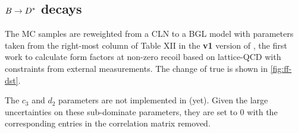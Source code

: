 \subsection{$B \rightarrow {\ensuremath{{D}^*}}$ decays}

The \Dstar MC samples are reweighted from a CLN to a BGL model with parameters
taken from the right-most column of Table XII in the \textbf{v1} version of
\cite{Bazavov_2021},
the first work to calculate \Dstar form factors at non-zero recoil
based on lattice-QCD with constraints from external measurements.
The change of true \qSq is shown in \cref{fig:ff-dst}.

The $c_3$ and $d_2$ parameters are not implemented in \Hammer (yet).
Given the large uncertainties on these sub-dominate parameters,
they are set to 0 with the corresponding entries in the correlation matrix
removed.

